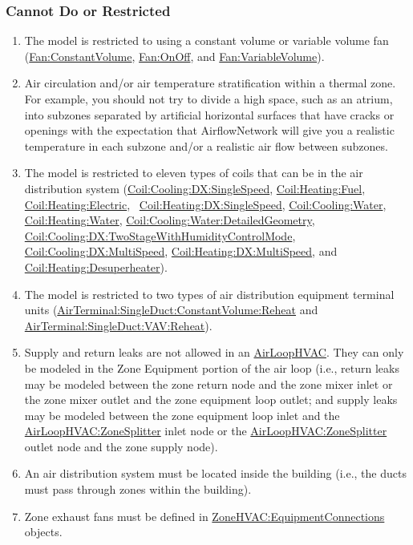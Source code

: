 \subsubsection{Cannot Do or Restricted}\label{cannot-do-or-restricted}
\begin{enumerate}
\item The model is restricted to using a constant volume or variable volume fan (\hyperref[fanconstantvolume]{Fan:ConstantVolume}, \hyperref[fanonoff]{Fan:OnOff}, and \hyperref[fanvariablevolume]{Fan:VariableVolume}).
\item Air circulation and/or air temperature stratification within a thermal zone. For example, you should not try to divide a high space, such as an atrium, into subzones separated by artificial horizontal surfaces that have cracks or openings with the expectation that AirflowNetwork will give you a realistic temperature in each subzone and/or a realistic air flow between subzones.
\item The model is restricted to eleven types of coils that can be in the air distribution system (\hyperref[coilcoolingdxsinglespeed]{Coil:Cooling:DX:SingleSpeed}, \hyperref[coilheatinggas-000]{Coil:Heating:Fuel}, \hyperref[coilheatingelectric]{Coil:Heating:Electric},~ \hyperref[coilheatingdxsinglespeed]{Coil:Heating:DX:SingleSpeed}, \hyperref[coilcoolingwater]{Coil:Cooling:Water}, \hyperref[coilheatingwater]{Coil:Heating:Water}, \hyperref[coilcoolingwaterdetailedgeometry]{Coil:Cooling:Water:DetailedGeometry}, \hyperref[coilcoolingdxtwostagewithhumiditycontrolmode]{Coil:Cooling:DX:TwoStageWithHumidityControlMode}, \hyperref[coilcoolingdxmultispeed]{Coil:Cooling:DX:MultiSpeed}, \hyperref[coilheatingdxmultispeed]{Coil:Heating:DX:MultiSpeed}, and \hyperref[coilheatingdesuperheater]{Coil:Heating:Desuperheater}).
\item The model is restricted to two types of air distribution equipment terminal units (\hyperref[airterminalsingleductconstantvolumereheat]{AirTerminal:SingleDuct:ConstantVolume:Reheat} and \hyperref[airterminalsingleductvavreheat]{AirTerminal:SingleDuct:VAV:Reheat}).
\item Supply and return leaks are not allowed in an \hyperref[airloophvac]{AirLoopHVAC}. They can only be modeled in the Zone Equipment portion of the air loop (i.e., return leaks may be modeled between the zone return node and the zone mixer inlet or the zone mixer outlet and the zone equipment loop outlet; and supply leaks may be modeled between the zone equipment loop inlet and the \hyperref[airloophvaczonesplitter]{AirLoopHVAC:ZoneSplitter} inlet node or the \hyperref[airloophvaczonesplitter]{AirLoopHVAC:ZoneSplitter} outlet node and the zone supply node).
\item An air distribution system must be located inside the building (i.e., the ducts must pass through zones within the building).
\item Zone exhaust fans must be defined in \hyperref[zonehvacequipmentconnections]{ZoneHVAC:EquipmentConnections} objects.
\end{enumerate}

